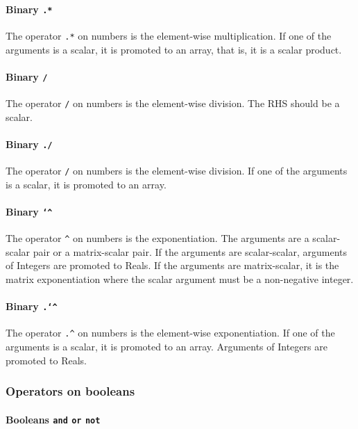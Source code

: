\documentclass[10pt,b5paper]{article}
\begin{document}
\paragraph{Binary {\tt{}.*}}

The operator \verb'.*' on numbers is the element-wise multiplication.
If one of the arguments is a scalar, it is promoted to an array, that
is, it is a scalar product.

\paragraph{Binary {\tt{}/}}

The operator \verb'/' on numbers is the element-wise division.  The
RHS should be a scalar.

\paragraph{Binary {\tt{}./}}

The operator \verb'/' on numbers is the element-wise division.  If one
of the arguments is a scalar, it is promoted to an array.

\paragraph{Binary {\tt{}\char`\^}}

The operator \verb'^' on numbers is the exponentiation.  The arguments
are a scalar-scalar pair or a matrix-scalar pair.  If the arguments
are scalar-scalar, arguments of Integers are promoted to Reals.  If
the arguments are matrix-scalar, it is the matrix exponentiation where
the scalar argument must be a non-negative integer.

\paragraph{Binary {\tt{}.\char`\^}}

The operator \verb'.^' on numbers is the element-wise exponentiation.
If one of the arguments is a scalar, it is promoted to an array.
Arguments of Integers are promoted to Reals.

\subsubsection*{Operators on booleans}

\paragraph{Booleans {\tt{}and} {\tt{}or} {\tt{}not}}
\end{document}
